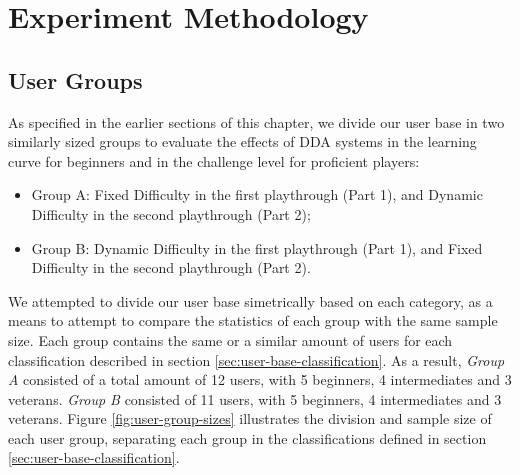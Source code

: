 
\section{Experiment Methodology}
\label{sec:experiment-methodology}


\subsection{User Groups}


As specified in the earlier sections of this chapter, we divide our user base in two similarly sized groups to evaluate the effects of DDA systems in the learning curve for beginners and in the challenge level for proficient players:
\begin{itemize}
    \item{Group A: Fixed Difficulty in the first playthrough (Part 1), and Dynamic Difficulty in the second playthrough (Part 2);}
    \item{Group B: Dynamic Difficulty in the first playthrough (Part 1), and Fixed Difficulty in the second playthrough (Part 2).}
\end{itemize}


We attempted to divide our user base simetrically based on each category, as a means to attempt to compare the statistics of each group with the same sample size. Each group contains the same or a similar amount of users for each classification described in section \ref{sec:user-base-classification}. As a result, \emph{Group A} consisted of a total amount of 12 users, with 5 beginners, 4 intermediates and 3 veterans. \emph{Group B} consisted of 11 users, with 5 beginners, 4 intermediates and 3 veterans. Figure \ref{fig:user-group-sizes} illustrates the division and sample size of each user group, separating each group in the classifications defined in section \ref{sec:user-base-classification}.

